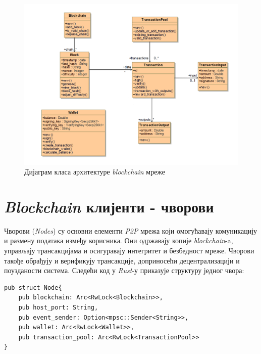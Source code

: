 \documentclass[12pt, a4paper]{article}
\begin{document}
\begin{figure}[h]
    \centering
    \includegraphics[width=1\linewidth]{slike/blockchain_class.png}
    \caption{Дијаграм класа архитектуре \textit{blockchain} мреже}
    \label{fig:enter-label}
\end{figure}

\newpage



\section{\textit{Blockchain} клијенти - чворови}
Чворови (\textit{Nodes}) су основни елементи \textit{P2P} мрежа који омогућавају комуникацију и размену података између корисника. Они одржавају копије \textit{blockchain}-a, управљају трансакцијама и осигуравају интегритет и безбедност мреже. Чворови такође обрађују и верификују трансакције, доприносећи децентрализацији и поузданости система. Следећи код у \textit{Rust}-у приказује структуру једног чвора:

\begin{verbatim}
pub struct Node{
    pub blockchain: Arc<RwLock<Blockchain>>,
    pub host_port: String,
    pub event_sender: Option<mpsc::Sender<String>>,
    pub wallet: Arc<RwLock<Wallet>>,
    pub transaction_pool: Arc<RwLock<TransactionPool>>
}

\end{verbatim}
\end{document}
